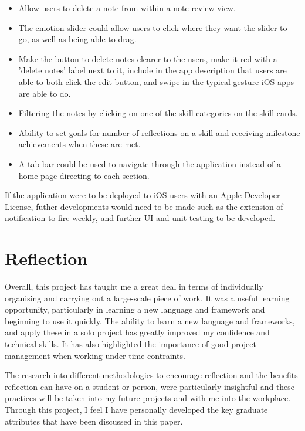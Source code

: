 \documentclass{l4proj}
\begin{document}
\begin{itemize}
    \item Allow users to delete a note from within a note review view.
    \item The emotion slider could allow users to click where they want the slider to go, as well as being able to drag.
    \item Make the button to delete notes clearer to the users, make it red with a 'delete notes' label next to it, include in the app description that users are able to both click the edit button, and swipe in the typical gesture iOS apps are able to do.
    \item Filtering the notes by clicking on one of the skill categories on the skill cards.
    \item Ability to set goals for number of reflections on a skill and receiving milestone achievements when these are met.
    \item A tab bar could be used to navigate through the application instead of a home page directing to each section.
\end{itemize}

If the application were to be deployed to iOS users with an Apple Developer License, futher developments would need to be made such as the extension of notification to fire weekly, and further UI and unit testing to be developed. 


\section{Reflection}

Overall, this project has taught me a great deal in terms of individually organising and carrying out a large-scale piece of work. It was a useful learning opportunity, particularly in learning a new language and framework and beginning to use it quickly. The ability to learn a new language and frameworks, and apply these in a solo project has greatly improved my confidence and technical skills. It has also highlighted the importance of good project management when working under time contraints. 

The research into different methodologies to encourage reflection and the benefits reflection can have on a student or person, were particularly insightful and these practices will be taken into my future projects and with me into the workplace. Through this project, I feel I have personally developed the key graduate attributes that have been discussed in this paper.
\end{document}
